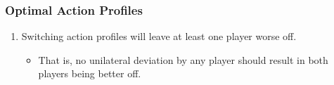 \subsubsection{Optimal Action Profiles}
\begin{process}
    \begin{enumerate}
        \item Switching action profiles will leave at least one player worse off.
        \begin{itemize}
            \item That is, no unilateral deviation by any player should result in both players being better off.
        \end{itemize}
    \end{enumerate}
\end{process} 

